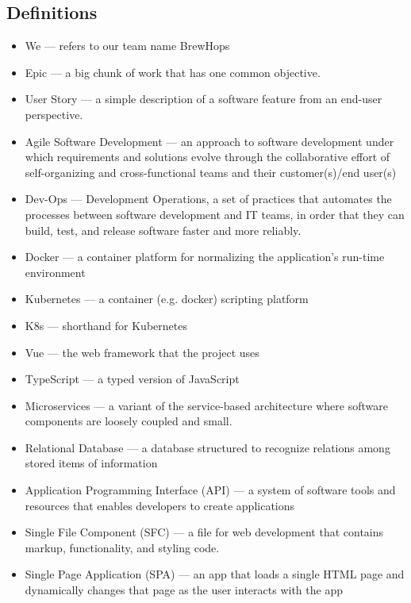 \documentclass[draftclsnofoot,onecolumn,journal,letterpaper,compsoc,10pt]{IEEEtran}
\begin{document}
    \subsection{Definitions}
    \begin{itemize}
        \item We --- refers to our team name BrewHops
        \item Epic --- a big chunk of work that has one common objective.
        \item User Story --- a simple description of a software feature from an end-user perspective.
        \item Agile Software Development --- an approach to software development under which requirements and solutions evolve through the collaborative effort of self-organizing and cross-functional teams and their customer(s)/end user(s)
        \item Dev-Ops --- Development Operations, a set of practices that automates the processes between software development and IT teams, in order that they can build, test, and release software faster and more reliably.
        \item Docker --- a container platform for normalizing the application's run-time environment \cite{docker}
        \item Kubernetes --- a container (e.g. docker) scripting platform \cite{kubernetes}
        \item K8s --- shorthand for Kubernetes
        \item Vue --- the web framework that the project uses \cite{react}
        \item TypeScript --- a typed version of JavaScript \cite{typescript}
        \item Microservices --- a variant of the service-based architecture where software components are loosely coupled and small.
        \item Relational Database --- a database structured to recognize relations among stored items of information
        \item Application Programming Interface (API) --- a system of software tools and resources that enables developers to create applications 
        \item Single File Component (SFC) --- a file for web development that contains markup, functionality, and styling code.
        \item Single Page Application (SPA) --- an app that loads a single HTML page and dynamically changes that page as the user interacts with the app
    \end{itemize}
\end{document}
